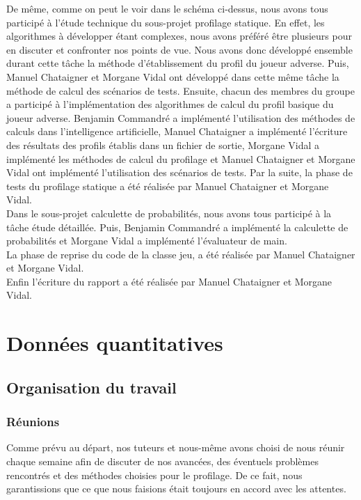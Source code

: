 \documentclass{report}
\begin{document}
De même, comme on peut le voir dans le schéma ci-dessus, nous avons tous participé à l'étude technique du sous-projet profilage statique. En effet, les algorithmes à développer étant complexes, nous avons préféré être plusieurs pour en discuter et confronter nos points de vue. Nous avons donc développé ensemble durant cette tâche la méthode d'établissement du profil du joueur adverse. Puis, Manuel Chataigner et Morgane Vidal ont développé dans cette même tâche la méthode de calcul des scénarios de tests. Ensuite, chacun des membres du groupe a participé à l'implémentation des algorithmes de calcul du profil basique du joueur adverse. Benjamin Commandré a implémenté l'utilisation des méthodes de calculs dans l'intelligence artificielle, Manuel Chataigner a implémenté l'écriture des résultats des profils établis dans un fichier de sortie, Morgane Vidal a implémenté les méthodes de calcul du profilage et Manuel Chataigner et Morgane Vidal ont implémenté l'utilisation des scénarios de tests.
Par la suite, la phase de tests du profilage statique a été réalisée par Manuel Chataigner et Morgane Vidal. \\

Dans le sous-projet calculette de probabilités, nous avons tous participé à la tâche étude détaillée. Puis, Benjamin Commandré a implémenté la calculette de probabilités et Morgane Vidal a implémenté l'évaluateur de main.\\

La phase de reprise du code de la classe jeu, a été réalisée par Manuel Chataigner et Morgane Vidal. \\

Enfin l'écriture du rapport a été réalisée par Manuel Chataigner et Morgane Vidal.\par

\chapter{Données quantitatives}

\section{Organisation du travail}

\subsection{Réunions}
\hspace{0.5cm}Comme prévu au départ, nos tuteurs et nous-même avons choisi de nous réunir chaque semaine afin de discuter de nos avancées, des éventuels problèmes rencontrés et des méthodes choisies pour le profilage. De ce fait, nous garantissions que ce que nous faisions était toujours en accord avec les attentes.\\
\end{document}
